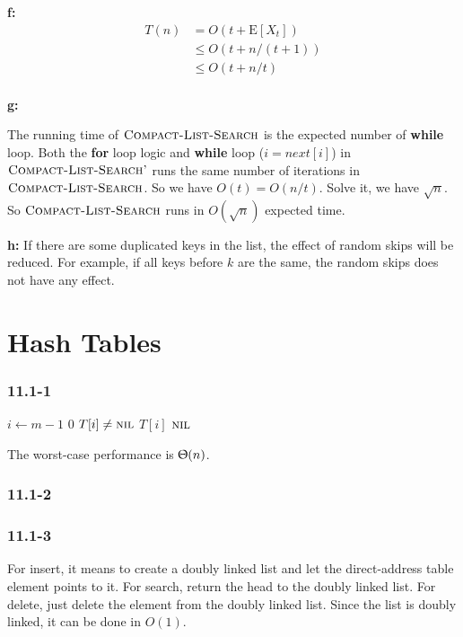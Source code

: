 \documentclass{book}
\begin{document}
\begin{CJK}{UTF8}{gkai}
\textbf{f:}
\begin{align*}
T(n) & = O(t+\text{E}[X_t]) \\
& \le O(t+n/(t+1)) \\
& \le O(t+n/t) \\
\end{align*}

\textbf{g:}

The running time of $\textnormal{\scshape Compact-List-Search}$ is the expected number of 
\textbf{while} loop. Both the \textbf{for} loop logic and \textbf{while} loop 
($i = next[i]$) in $\textnormal{\scshape Compact-List-Search'}$ runs the same number of 
iterations in $\textnormal{\scshape Compact-List-Search}$. So we have $O(t) = O(n/t)$. Solve 
it, we have $\sqrt{n}$. So $\textnormal{\scshape Compact-List-Search}$ runs in $O(\sqrt{n})$ 
expected time.


\textbf{h:}
If there are some duplicated keys in the list, the effect of random skips will 
be reduced. For example, if all keys before $k$ are the same, the random skips 
does not have any effect.

\chapter{Hash Tables}
\subsection*{11.1-1}

\begin{codebox}
\li \For $i \gets m-1$ \To $0$
\li \Do \If $T[i] \ne \textnormal{\scshape nil}$
\li \Then \Return $T[i]$
\End
\End
\li \Return $\textnormal{\scshape nil}$
\end{codebox}
The worst-case performance is $\Uptheta(n)$.

\subsection*{11.1-2}
%

\subsection*{11.1-3}
For insert, it means to create a doubly linked list and let the direct-address 
table element points to it. For search, return the head to the doubly linked 
list. For delete, just delete the element from the doubly linked list. Since the 
list is doubly linked, it can be done in $O(1)$.


\end{CJK}
\end{document}

